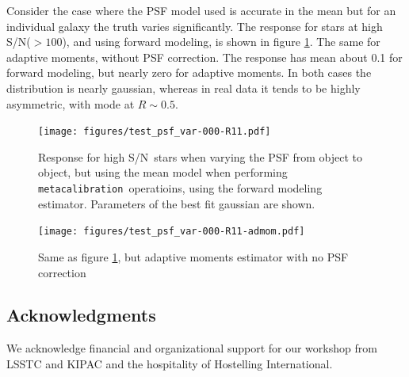 \documentclass[\docopts]{\docclass}
\newcommand{\mcal}{\texttt{metacalibration}}
\newcommand{\snr}{S/N}
\begin{document}
Consider the case where the PSF model used is accurate in the mean but 
for an individual galaxy the truth varies significantly.  The response
for stars at high \snr ($> 100$), and using forward modeling, is shown in
figure \ref{fig:Rstarfm}.  The same for adaptive moments, without
PSF correction. The response has mean about 0.1 for forward modeling,
but nearly zero for adaptive moments.  In both cases the distribution
is nearly gaussian, whereas in real data it tends to be highly asymmetric,
with mode at $R \sim 0.5$.


\begin{figure}[p]
    \centering
    \texttt{[image: figures/test\_psf\_var-000-R11.pdf]}

    \caption{Response for high \snr\ stars when varying the PSF from
    object to object, but using
    the mean model when performing \mcal\ operatioins, using the forward modeling estimator.
    Parameters of the best fit gaussian are shown. }

	\label{fig:Rstarfm}

\end{figure}
\begin{figure}[p]
    \centering
    \texttt{[image: figures/test\_psf\_var-000-R11-admom.pdf]}

    \caption{Same as figure \ref{fig:Rstarfm}, but adaptive moments estimator with no PSF correction}

	\label{fig:Rstaram}

\end{figure}




\subsection*{Acknowledgments}

We acknowledge financial and organizational support for our workshop from LSSTC and KIPAC and the hospitality of Hostelling International.





\end{document}
